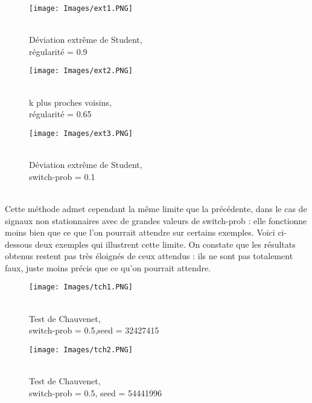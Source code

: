 \documentclass[a4paper,12pt]{article} %
\begin{document}
                \begin{figure}[H] %
                \texttt{[image: Images/ext1.PNG]} %
                \caption{\\Déviation extrême de Student,\\ régularité = 0.9} %
                \label{m15} %
                \endminipage
                \hfill
                \endminipage
                \texttt{[image: Images/ext2.PNG]}
                \caption{\\k plus proches voisins,\\ régularité = 0.65}
                \label{m5}
                \endminipage
                \hfill
                \endminipage
                \texttt{[image: Images/ext3.PNG]}  
                
                \caption{\\Déviation extrême de Student,\\ switch-prob = 0.1}
                
                \label{m35}
                \endminipage
                \end{figure}
                \\
                Cette méthode admet cependant la même limite que la précédente, dans le cas de signaux non stationnaires avec de grandes valeurs de switch-prob : elle fonctionne moins bien que ce que l'on pourrait attendre sur certains exemples. Voici ci-dessous deux exemples qui illustrent cette limite. On constate que les résultats obtenus restent pas très éloignés de ceux attendus : ils ne sont pas totalement faux, juste moins précis que ce qu'on pourrait attendre.
                \begin{figure}[H] %
                \texttt{[image: Images/tch1.PNG]} %
                \caption{\\Test de Chauvenet,\\switch-prob = 0.5,seed = 32427415} %
                \label{m15} %
                \endminipage
                \texttt{[image: Images/tch2.PNG]}  
                \caption{\\Test de Chauvenet,\\switch-prob = 0.5, seed = 54441996}
                \label{m5}
                \endminipage
                \end{figure}
            
\end{document}
